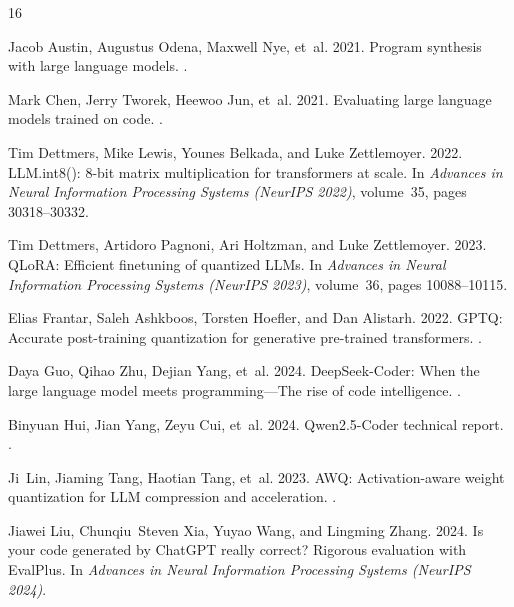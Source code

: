 \documentclass[11pt,twocolumn]{article}
\begin{document}
\clearpage

{\footnotesize
\begin{thebibliography}{16}
\footnotesize
\setlength{\itemsep}{0.5pt plus 0.5pt}
\setlength{\parsep}{0pt}
\setlength{\parskip}{0pt}

Jacob Austin, Augustus Odena, Maxwell Nye, et~al. 2021.
\newblock Program synthesis with large language models.
.

Mark Chen, Jerry Tworek, Heewoo Jun, et~al. 2021.
\newblock Evaluating large language models trained on code.
.

Tim Dettmers, Mike Lewis, Younes Belkada, and Luke Zettlemoyer. 2022.
\newblock LLM.int8(): 8-bit matrix multiplication for transformers at scale.
\newblock In {\em Advances in Neural Information Processing Systems (NeurIPS 2022)}, volume~35, pages 30318--30332.

Tim Dettmers, Artidoro Pagnoni, Ari Holtzman, and Luke Zettlemoyer. 2023.
\newblock QLoRA: Efficient finetuning of quantized LLMs.
\newblock In {\em Advances in Neural Information Processing Systems (NeurIPS 2023)}, volume~36, pages 10088--10115.

Elias Frantar, Saleh Ashkboos, Torsten Hoefler, and Dan Alistarh. 2022.
\newblock GPTQ: Accurate post-training quantization for generative pre-trained transformers.
.

Daya Guo, Qihao Zhu, Dejian Yang, et~al. 2024.
\newblock DeepSeek-Coder: When the large language model meets programming---The rise of code intelligence.
.

Binyuan Hui, Jian Yang, Zeyu Cui, et~al. 2024.
\newblock Qwen2.5-Coder technical report.
.

Ji~Lin, Jiaming Tang, Haotian Tang, et~al. 2023.
\newblock AWQ: Activation-aware weight quantization for LLM compression and acceleration.
.

Jiawei Liu, Chunqiu~Steven Xia, Yuyao Wang, and Lingming Zhang. 2024.
\newblock Is your code generated by ChatGPT really correct? Rigorous evaluation with EvalPlus.
\newblock In {\em Advances in Neural Information Processing Systems (NeurIPS 2024)}.


\end{thebibliography}}
\end{document}
